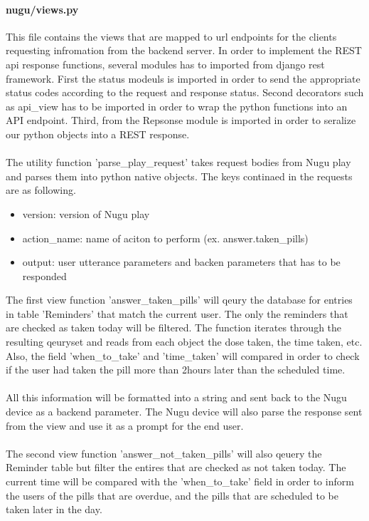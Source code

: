 \documentclass[conference]{IEEEtran}
\begin{document}
\paragraph{nugu/views.py}
This file contains the views that are mapped to url endpoints for the clients requesting infromation from the backend server. In order to implement the REST api response functions, several modules has to imported from django rest framework. First the status modeuls is imported in order to send the appropriate status codes according to the request and response status. Second decorators such as api\_view has to be imported in order to wrap the python functions into an API endpoint. Third, from the Repsonse module is imported in order to seralize our python objects into a REST response. \\ \\
The utility function 'parse\_play\_request' takes request bodies from Nugu play and parses them into python native objects. The keys continaed in the requests are as following.\\
\begin{itemize}
    \item version: version of Nugu play
    \item action\_name: name of aciton to perform (ex. answer.taken\_pills)
    \item output: user utterance parameters and backen parameters that has to be responded
\end{itemize}
\noindent
\newline
The first view function 'answer\_taken\_pills' will qeury the database for entries in table 'Reminders' that match the current user. The only the reminders that are checked as taken today will be filtered. The function iterates through the resulting qeuryset and reads from each object the dose taken, the time taken, etc. Also, the field 'when\_to\_take' and 'time\_taken' will compared in order to check if the user had taken the pill more than 2hours later than the scheduled time. \\ \\
All this information will be formatted into a string and sent back to the Nugu device as a backend parameter. The Nugu device will also parse the response sent from the view and use it as a prompt for the end user. \\ \\
The second view function 'answer\_not\_taken\_pills' will also qeuery the Reminder table but filter the entires that are checked as not taken today. The current time will be compared with the 'when\_to\_take' field in order to inform the users of the pills that are overdue, and the pills that are scheduled to be taken later in the day. 
\\
\end{document}
